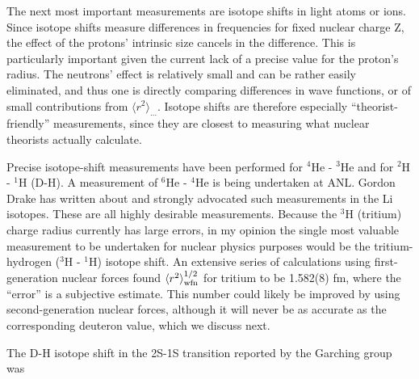 \documentclass{svmult}
\begin{document}
The next most important measurements are isotope
shifts in light atoms or ions. Since isotope
shifts measure differences in frequencies for fixed nuclear charge Z, the effect
of the protons' intrinsic size cancels in the difference. This is particularly
important given the current lack of a precise value for the proton's radius. The
neutrons' effect is relatively small and can be rather easily eliminated, and
thus one is directly comparing differences in wave functions, or of small
contributions from $\langle r^2 \rangle_{\ldots}$. Isotope shifts are therefore
especially ``theorist-friendly'' measurements, since they are closest to
measuring what nuclear theorists actually calculate.

Precise isotope-shift measurements have been performed for $^4$He -
$^3$He\cite{shiner} and for $^2$H - $^1$H
(D-H)\cite{d-p}. A measurement of $^6$He
- $^4$He is being undertaken\cite{ANL} at ANL.  Gordon Drake has written about
and strongly advocated such measurements in the Li
isotopes\cite{Li-IS}. These are all highly
desirable measurements. Because the $^3$H (tritium) charge radius currently has
large errors, in my opinion the single most valuable measurement to
be undertaken for nuclear physics purposes would be the tritium-hydrogen ($^3$H
- $^1$H) isotope shift.  An extensive series of calculations using
first-generation nuclear forces found $\langle r^2 \rangle_{\rm wfn}^{1/2}$ for
tritium to be 1.582(8) fm, where the
``error'' is a subjective estimate\cite{radius}. This number could likely be
improved by using second-generation nuclear forces, although it will never be as
accurate as the corresponding deuteron value, which we discuss next.

The D-H isotope shift in the 2S-1S
transition reported by the Garching group\cite{d-p} was
\end{document}
